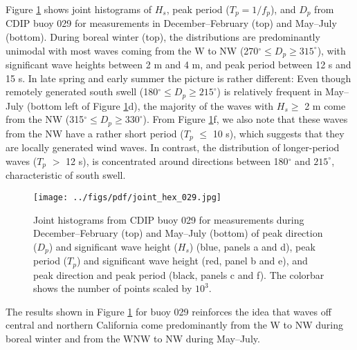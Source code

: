 Figure \ref{joint} shows joint histograms of $H_s$, peak period ($T_p = 1/f_p$), and $D_p$ from CDIP buoy 029 for measurements in December--February (top) and May--July (bottom). During boreal winter (top), the distributions are predominantly unimodal with most waves coming from the W to NW (270$^\circ \leq D_p \geq 315^\circ$), with significant wave heights between 2 m and 4 m, and peak period between 12 s and 15 s. In late spring and early summer the picture is rather different: Even though remotely generated south swell (180$^\circ \leq D_p \geq 215^\circ$) is relatively frequent in May--July (bottom left of Figure \ref{joint}d), the majority of the waves with $H_s \geq$ 2 m come from the NW (315$^\circ \leq D_p \geq 330^\circ$). From Figure \ref{joint}f, we also note that these waves from the NW have a rather short period ($T_p$ $\leq$ 10 s), which suggests that they are locally generated wind waves. In contrast, the distribution of longer-period waves ($T_p$ $>$ 12 s), is concentrated around directions between 180$^\circ$ and $215^\circ$, characteristic of south swell. 
\begin{figure}[h]
\centering
\texttt{[image: ../figs/pdf/joint\_hex\_029.jpg]}
\caption{Joint histograms from CDIP buoy 029 for measurements during December--February (top) and May--July (bottom) of peak direction ($D_p$) and significant wave height ($H_s$) (blue, panels a and d), peak period ($T_p$) and significant wave height (red, panel b and e), and peak direction and peak period  (black, panels c and f). The colorbar shows the number of points scaled by $10^3$. }
\label{joint}
\end{figure}
The results shown in Figure \ref{joint} for buoy 029 reinforces the idea that waves off central and northern California come predominantly from the W to NW during boreal winter and from the WNW to NW during May--July. 

